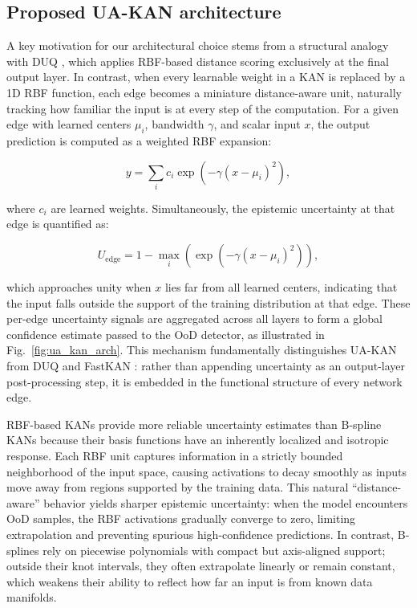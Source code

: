 \documentclass[conference]{IEEEtran}
\begin{document}
\subsection{Proposed UA-KAN architecture}

A key motivation for our architectural choice stems from a structural analogy with DUQ \cite{vanamersfoort2020uncertaintyestimationusingsingle}, which applies RBF-based distance scoring exclusively at the final output layer. In contrast, when every learnable weight in a KAN is replaced by a 1D RBF function, each edge becomes a miniature distance-aware unit, naturally tracking how familiar the input is at every step of the computation. For a given edge with learned centers $\mu_i$, bandwidth $\gamma$, and scalar input $x$, the output prediction is computed as a weighted RBF expansion:

\begin{equation} \label{eq:edgepred}
y = \sum_i c_i \exp\!\left(-\gamma(x - \mu_i)^2\right),
\end{equation}

where $c_i$ are learned weights. Simultaneously, the epistemic uncertainty at that edge is quantified as:

\begin{equation} \label{eq:edgeuncert}
U_{\text{edge}} = 1 - \max_i \left(\exp\!\left(-\gamma(x - \mu_i)^2\right)\right),
\end{equation}

which approaches unity when $x$ lies far from all learned centers, indicating that the input falls outside the support of the training distribution at that edge. These per-edge uncertainty signals are aggregated across all layers to form a global confidence estimate passed to the OoD detector, as illustrated in Fig.~\ref{fig:ua_kan_arch}. This mechanism fundamentally distinguishes UA-KAN from DUQ and FastKAN \cite{li2024kolmogorovarnoldnetworksradialbasis}: rather than appending uncertainty as an output-layer post-processing step, it is embedded in the functional structure of every network edge.


RBF-based KANs provide more reliable uncertainty estimates than B-spline KANs because their basis functions have an inherently localized and isotropic response. Each RBF unit captures information in a strictly bounded neighborhood of the input space, causing activations to decay smoothly as inputs move away from regions supported by the training data. This natural “distance-aware” behavior yields sharper epistemic uncertainty: when the model encounters OoD samples, the RBF activations gradually converge to zero, limiting extrapolation and preventing spurious high-confidence predictions. In contrast, B-splines rely on piecewise polynomials with compact but axis-aligned support; outside their knot intervals, they often extrapolate linearly or remain constant, which weakens their ability to reflect how far an input is from known data manifolds. 
\end{document}

